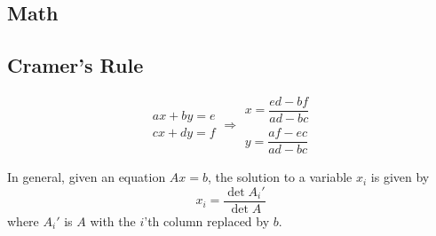 \documentclass[letterpaper,landscape]{article}
\begin{document}
\begingroup
\let\cleardoublepage\clearpage
\endgroup

\begin{multicols*}{3}


  \tableofcontents

  \clearpage
  
  \section{Math}
    
    \subsection{Cramer's Rule}
    \[\begin{aligned}ax+by=e\\cx+dy=f\end{aligned}
    \Rightarrow
    \begin{aligned}x=\dfrac{ed-bf}{ad-bc}\\y=\dfrac{af-ec}{ad-bc}\end{aligned}\]
    
    In general, given an equation $Ax = b$, the solution to a variable $x_i$ is given by
    \[x_i = \frac{\det A_i'}{\det A} \]
    where $A_i'$ is $A$ with the $i$'th column replaced by $b$.
    

\end{multicols*}
\end{document}
